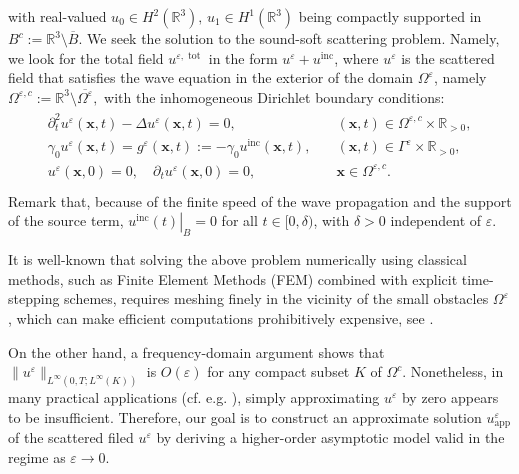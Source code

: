 \documentclass[]{article}
\numberwithin{equation}{section}
\numberwithin{theorem}{section}
\numberwithin{lemma}{section}
\numberwithin{corollary}{section}
\numberwithin{proposition}{section}
\numberwithin{definition}{section}
\newcommand{\bx}{\boldsymbol{x}}
\newcommand{\re}{\varepsilon}
\newcommand{\inc}{\operatorname{inc}}
\begin{document}
	with real-valued $u_0\in H^2(\mathbb{R}^3), \, u_1\in H^1(\mathbb{R}^3)$ being compactly supported in $B^c:=\mathbb{R}^3\setminus\overline{B}$. 
	We seek the solution to the sound-soft scattering problem. Namely, we look for the total field $ u^{\re, \operatorname{tot}} $ in the form $u^{\re} + u^{\operatorname{inc}} $, where $ u^{\re} $ is the scattered field that satisfies the wave equation in the exterior of the domain $\Omega^{\re}$, namely $
	\Omega^{\re, c}:=\mathbb{R}^3\setminus \overline{\Omega^{\re}}, $
	with the inhomogeneous Dirichlet boundary conditions:
	\begin{align}
		\label{main_problem}
		\begin{array}{ll}
			\partial^2_t u^{\re}(\boldsymbol{x}, t) - \Delta u^{\re}(\boldsymbol{x}, t) = 0, & \quad (\boldsymbol{x}, t) \in \Omega^{\re, c} \times \mathbb{R}_{>0}, \\
			\gamma_0 u^{\re} (\boldsymbol{x}, t)= g^{\re} (\boldsymbol{x}, t):=- \gamma_0 u^{\operatorname{inc}} (\boldsymbol{x}, t), & \quad (\bx, t)\in\Gamma^{\re} \times \mathbb{R}_{>0}, \\
			u^{\re}(\boldsymbol{x}, 0) = 0, \quad \partial_t u^{\re}(\boldsymbol{x}, 0) = 0, & \quad \boldsymbol{x} \in \Omega^{\re, c}. \\
		\end{array}
	\end{align}
	Remark that, because of the finite speed of the wave propagation and the support of the source term, $\left.u^{\inc}(t)\right|_B=0$ for all $t\in [0, \delta)$, with $\delta>0$ independent of $\re$. 
	
	It is well-known that solving the above problem numerically using classical methods, such as Finite Element Methods (FEM) combined with explicit time-stepping schemes, requires meshing finely in the vicinity of the small obstacles $\Omega^{\re}$, which can make efficient computations prohibitively expensive, see \cite{barucq}.
	
	On the other hand, a frequency-domain argument shows that $\| u^{\re} \|_{L^{\infty}(0,T; L^{\infty}(K))}$ is $O(\re)$ for any compact subset $K$ of $\Omega^{c}$. Nonetheless, in many practical applications (cf. e.g. \cite{imaging_time_reversal,dort,dort_original}), simply approximating $u^{\re}$ by zero appears to be insufficient. Therefore, our goal is to construct an approximate solution $u^{\re}_{\operatorname{app}}$ of the scattered filed $u^{\re}$ by deriving a higher-order asymptotic model valid in the regime as $ \re \to 0 $. 
	
\end{document}
